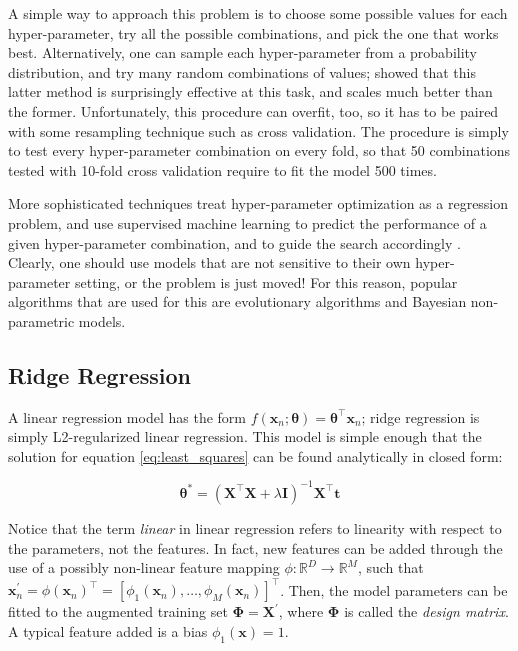 \documentclass[a4paper]{book}
\begin{document}
A simple way to approach this problem is to choose some possible values for each hyper-parameter, try all the possible combinations, and pick the one that works best. Alternatively, one can sample each hyper-parameter from a probability distribution, and try many random combinations of values; \cite{random_search} showed that this latter method is surprisingly effective at this task, and scales much better than the former. Unfortunately, this procedure can overfit, too, so it has to be paired with some resampling technique such as cross validation. The procedure is simply to test every hyper-parameter combination on every fold, so that 50 combinations tested with 10-fold cross validation require to fit the model 500 times.

More sophisticated techniques treat hyper-parameter optimization as a regression problem, and use supervised machine learning to predict the performance of a given hyper-parameter combination, and to guide the search accordingly \citep{hyperopt}. Clearly, one should use models that are not sensitive to their own hyper-parameter setting, or the problem is just moved! For this reason, popular algorithms that are used for this are evolutionary algorithms and Bayesian non-parametric models.

\subsection{Ridge Regression}
\label{sec:ridge}
A linear regression model has the form $f(\bm x_n;\bm\theta)=\bm\theta^\intercal\bm x_n$; ridge regression is simply L2-regularized linear regression. This model is simple enough that the solution for equation \ref{eq:least_squares} can be found analytically in closed form:

\begin{equation}
\label{eq:ridge_solution}
\bm\theta^*=(\bm X^\intercal\bm X+\lambda\bm I)^{-1}\bm X^\intercal\bm t
\end{equation}

Notice that the term \emph{linear} in linear regression refers to linearity with respect to the parameters, not the features. In fact, new features can be added through the use of a possibly non-linear feature mapping $\phi:\mathbb{R}^D\rightarrow\mathbb{R}^M$, such that $\bm x^\prime_n=\phi(\bm x_n)^\intercal=\left[\phi_1(\bm x_n),\ldots,\phi_M(\bm x_n)\right]^\intercal$. Then, the model parameters can be fitted to the augmented training set $\bm\Phi=\bm X^\prime$, where $\bm\Phi$ is called the \emph{design matrix}. A typical feature added is a bias $\phi_1(\bm x)=1$.
\end{document}
